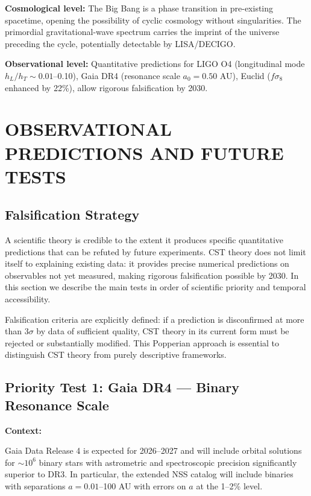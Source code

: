 \documentclass[10pt,a4paper]{article}
\begin{document}
\textbf{Cosmological level:} The Big Bang is a phase transition in
pre-existing spacetime, opening the possibility of cyclic cosmology
without singularities. The primordial gravitational-wave spectrum
carries the imprint of the universe preceding the cycle, potentially
detectable by LISA/DECIGO.

\textbf{Observational level:} Quantitative predictions for LIGO O4
(longitudinal mode \(h_L/h_T \sim 0.01\)--0.10), Gaia DR4 (resonance
scale \(a_0 = 0.50\) AU), Euclid (\(f\sigma_8\) enhanced by 22\%), allow
rigorous falsification by 2030.

\section{OBSERVATIONAL PREDICTIONS AND FUTURE
TESTS}\label{observational-predictions-and-future-tests}

\subsection{Falsification
Strategy}\label{falsification-strategy}

A scientific theory is credible to the extent it produces specific
quantitative predictions that can be refuted by future experiments. CST
theory does not limit itself to explaining existing data: it provides
precise numerical predictions on observables not yet measured, making
rigorous falsification possible by 2030. In this section we describe the
main tests in order of scientific priority and temporal accessibility.

Falsification criteria are explicitly defined: if a prediction is
disconfirmed at more than \(3\sigma\) by data of sufficient quality, CST
theory in its current form must be rejected or substantially modified.
This Popperian approach is essential to distinguish CST theory from
purely descriptive frameworks.

\subsection{Priority Test 1: Gaia DR4 --- Binary Resonance
Scale}\label{priority-test-1-gaia-dr4-binary-resonance-scale}

\textbf{Context:}

Gaia Data Release 4 is expected for 2026--2027 and will include orbital
solutions for \(\sim 10^6\) binary stars with astrometric and
spectroscopic precision significantly superior to DR3. In particular,
the extended NSS catalog will include binaries with separations
\(a = 0.01\)--100 AU with errors on \(a\) at the 1--2\% level.
\end{document}
